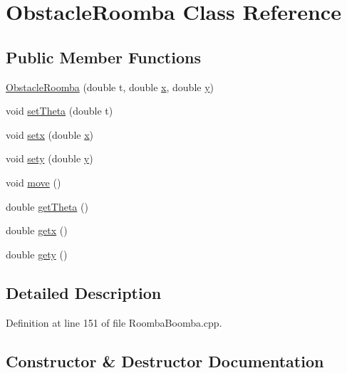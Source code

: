 \hypertarget{classObstacleRoomba}{}\section{Obstacle\+Roomba Class Reference}
\label{classObstacleRoomba}
\subsection*{Public Member Functions}
\begin{DoxyCompactItemize}
\item 
\mbox{\hyperlink{classObstacleRoomba_a7a33c19ee0a6f7c3b7081b7aee96e008}{Obstacle\+Roomba}} (double t, double \mbox{\hyperlink{plottingTest_8cpp_aa0155849a1850c1edcfe7bce685b08f1}{x}}, double \mbox{\hyperlink{plottingTest_8cpp_a64d0474b77956c0e971da1b6cb1ddacd}{y}})
\item 
void \mbox{\hyperlink{classObstacleRoomba_a98517d5de274bcf1e112afa78fe03ad1}{set\+Theta}} (double t)
\item 
void \mbox{\hyperlink{classObstacleRoomba_a3596a1ec48e9dafe5138e2187b819a1e}{setx}} (double \mbox{\hyperlink{plottingTest_8cpp_aa0155849a1850c1edcfe7bce685b08f1}{x}})
\item 
void \mbox{\hyperlink{classObstacleRoomba_a90dbf8bf101c7d6a9f6b227b1cfc39be}{sety}} (double \mbox{\hyperlink{plottingTest_8cpp_a64d0474b77956c0e971da1b6cb1ddacd}{y}})
\item 
void \mbox{\hyperlink{classObstacleRoomba_ad55afc5449e70511b0831c694d72cb97}{move}} ()
\item 
double \mbox{\hyperlink{classObstacleRoomba_a5f3bfef1c9c50bef6efbe4a6c7af829b}{get\+Theta}} ()
\item 
double \mbox{\hyperlink{classObstacleRoomba_a7a9a09d525974ac79ed738bfdc769fac}{getx}} ()
\item 
double \mbox{\hyperlink{classObstacleRoomba_adeea6821d17c665734b82a5dab6c4576}{gety}} ()
\end{DoxyCompactItemize}


\subsection{Detailed Description}


Definition at line 151 of file Roomba\+Boomba.\+cpp.



\subsection{Constructor \& Destructor Documentation}
\mbox{\label{classObstacleRoomba_a7a33c19ee0a6f7c3b7081b7aee96e008}} 
